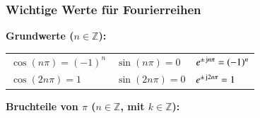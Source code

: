 \subsubsection{Wichtige Werte für Fourierreihen}

\noindent\textbf{Grundwerte ($n \in \mathbb{Z}$):}
\begin{center}
    \begin{tabular}{lll}
        $\cos(n\pi) = (-1)^n$ & $\sin(n\pi) = 0$  & $e^{\pm\mathop{} \! \mathrm{j} n\pi} = (-1)^n$ \\
        $\cos(2n\pi) = 1$     & $\sin(2n\pi) = 0$ & $e^{\pm\mathop{} \! \mathrm{j} 2n\pi} = 1$
    \end{tabular}
\end{center}

\noindent\textbf{Bruchteile von $\pi$ ($n \in \mathbb{Z}$, mit $k \in \mathbb{Z}$):}
